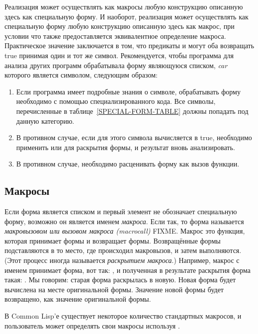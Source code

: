 Реализация может осуществлять как макросы любую конструкцию описанную здесь как
специальную форму. И наоборот, реализация может осуществлять как специальную
форму любую конструкцию описанную здесь как макрос, при условии что также
предоставляется эквивалентное определение макроса.
Практическое значение заключается в том, что предикаты  и
 могут оба возвращать true принимая один и тот же символ.
Рекомендуется, чтобы программа для анализа других программ обрабатывала форму
являющуюся списком, \emph{car} которого является символом, следующим образом:

\begin{enumerate}

\item
Если программа имеет подробные знания о символе, обрабатывать форму необходимо с
помощью специализированного кода. Все символы, перечисленные в
таблице~\ref{SPECIAL-FORM-TABLE} должны попадать под данную категорию.

\item
В противном случае, если для этого символа  вычисляется в
true, необходимо применить  или  для раскрытия
формы, и результат вновь анализировать.

\item
В противном случае, необходимо расценивать форму как вызов функции.
\end{enumerate}

\subsection{Макросы}

Если форма является списком и первый элемент не обозначает специальную
форму, возможно он является именем \emph{макроса}. Если так, то форма
называется \emph{макровызовом или вызовом макроса (macrocall)} FIXME. Макрос
это функция, которая принимает формы и возвращает формы. Возвращённые формы
подставляются в то место, где происходил макровызов, и затем выполняются. (Этот
процесс иногда называется \emph{раскрытием макроса}.)
Например, макрос с именем  принимает форма, вот так: ,
и полученная в результате раскрытия форма такая: . Мы
говорим: старая форма раскрылась в новую. Новая форма будет вычислена на месте
оригинальной формы. Значение новой формы будет возвращено, как значение
оригинальной формы.

В Common Lisp'е существует некоторое количество стандартных макросов, и
пользователь может определять свои макросы используя .

